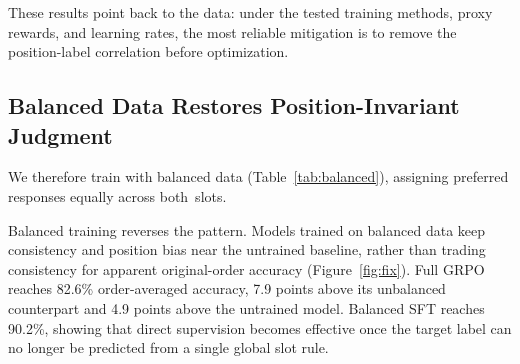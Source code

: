 \documentclass[letterpaper]{article}
\begin{document}
These results point back to the data: under the tested training methods, proxy rewards, and learning rates, the most reliable mitigation is to remove the position-label correlation before optimization.

\subsection{Balanced Data Restores Position-Invariant Judgment}

We therefore train with balanced data (Table~\ref{tab:balanced}), assigning preferred responses equally across both~slots.

Balanced training reverses the pattern. Models trained on balanced data keep consistency and position bias near the untrained baseline, rather than trading consistency for apparent original-order accuracy (Figure~\ref{fig:fix}). Full GRPO reaches 82.6\% order-averaged accuracy, 7.9 points above its unbalanced counterpart and 4.9 points above the untrained model. Balanced SFT reaches 90.2\%, showing that direct supervision becomes effective once the target label can no longer be predicted from a single global slot rule.

\begin{table}[H]
\centering
\scriptsize
\setlength{\tabcolsep}{2.0pt}
\caption{Balanced training (gold = 50\% A, 50\% B). Multi-seed entries report mean $\pm$ seed standard deviation. Data deconfounding keeps the first-position rate near 50\%, restores position-swap consistency, and improves order-averaged accuracy over the baseline.}
\label{tab:balanced}
\end{table}
\end{document}
